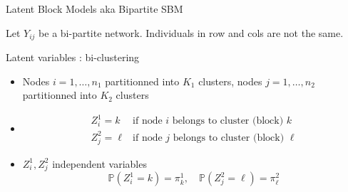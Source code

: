 \documentclass{beamer}\usepackage[]{graphicx}\usepackage[]{color}
\begin{document}
\begin{frame}{Latent Block Models aka Bipartite SBM}

Let $Y_{ij}$ be a bi-partite network. Individuals in row and cols are not the same. 

\begin{block}{Latent variables : bi-clustering}
\begin{itemize}
\item Nodes $i= 1,\dots,n_1$   partitionned into $K_1$ clusters,  nodes $j= 1,\dots,n_2$  partitionned into $K_2$ clusters
\item $$\begin{array}{cl}
Z^1_i = k & \mbox{if node $i$ belongs to cluster (block) $k$}\\
Z^2_j = \ell & \mbox{if node $j$ belongs to cluster (block) $\ell$}
\end{array}$$
\item $Z^1_i, Z^2_j$ independent variables
$$ \mathbb{P}(Z^1_i = k) = \pi^1_k,\quad  \mathbb{P}(Z^2_j = \ell) = \pi^2_\ell$$
\end{itemize}
\end{block}

\end{frame}
\end{document}

